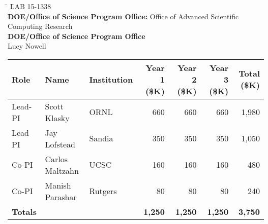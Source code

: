\bigskip

\begin{tabbing}
\hspace*{10mm} \=  \= LAB 15-1338 \\
\> \textbf{DOE/Office of Science Program Office:} \> Office of Advanced Scientific Computing Research\\
\> \textbf{DOE/Office of Science Program Office}  \> \\
\>  \> Lucy Nowell\\
\end{tabbing}

\medskip


\pagebreak


\begin{tabular}{| l | l | l | r | r | r | r |} \hline
Role & Name & Institution & Year 1 (\$K) & Year 2 (\$K) &   Year 3 (\$K) & Total (\$K) \\
\hline
Lead-PI & Scott Klasky & ORNL & 660 & 660 & 660 & 1,980 \\
Lead PI & Jay Lofstead & Sandia  & 350 & 350 & 350 & 1,050 \\
Co-PI & Carlos  Maltzahn & UCSC  & 160 & 160 & 160 & 480 \\
Co-PI & Manish Parashar & Rutgers & 80 & 80 & 80 & 240 \\
\hline
{\bf Totals}  & & & {\bf 1,250} & {\bf 1,250} & {\bf 1,250} & {\bf 3,750}\\
\hline
\end{tabular}

\newpage